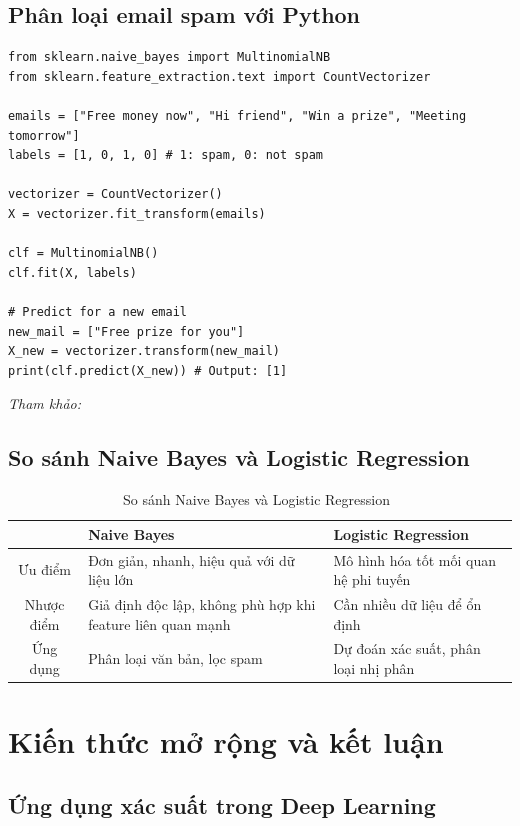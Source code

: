 \subsection{Phân loại email spam với Python}

\begin{lstlisting}[caption={Email classification with scikit-learn}]
from sklearn.naive_bayes import MultinomialNB
from sklearn.feature_extraction.text import CountVectorizer

emails = ["Free money now", "Hi friend", "Win a prize", "Meeting tomorrow"]
labels = [1, 0, 1, 0] # 1: spam, 0: not spam

vectorizer = CountVectorizer()
X = vectorizer.fit_transform(emails)

clf = MultinomialNB()
clf.fit(X, labels)

# Predict for a new email
new_mail = ["Free prize for you"]
X_new = vectorizer.transform(new_mail)
print(clf.predict(X_new)) # Output: [1]
\end{lstlisting}

\textit{Tham khảo:} \cite{scikit-learn}

\subsection{So sánh Naive Bayes và Logistic Regression}

\begin{table}[H]
\centering
\begin{tabularx}{0.8\textwidth}{|c|X|X|}
\hline
 & \textbf{Naive Bayes} & \textbf{Logistic Regression} \\
\hline
Ưu điểm & Đơn giản, nhanh, hiệu quả với dữ liệu lớn & Mô hình hóa tốt mối quan hệ phi tuyến \\
Nhược điểm & Giả định độc lập, không phù hợp khi feature liên quan mạnh & Cần nhiều dữ liệu để ổn định \\
Ứng dụng & Phân loại văn bản, lọc spam & Dự đoán xác suất, phân loại nhị phân \\
\hline
\end{tabularx}
\caption{So sánh Naive Bayes và Logistic Regression~\cite{rish2001empirical,wickramasinghe2021naive}}
\end{table}

\section{Kiến thức mở rộng và kết luận}

\subsection{Ứng dụng xác suất trong Deep Learning}

